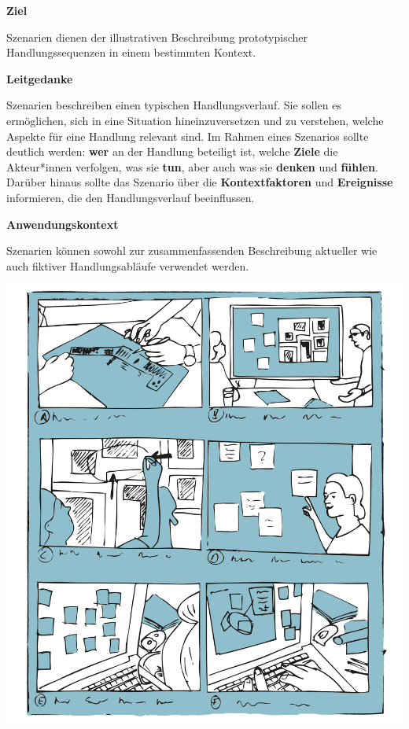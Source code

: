 \documentclass[
  a4paper,
]{book}
\begin{document}
\textbf{Ziel}

Szenarien dienen der illustrativen Beschreibung prototypischer Handlungssequenzen in einem bestimmten Kontext.

\textbf{Leitgedanke}

Szenarien beschreiben einen typischen Handlungsverlauf. Sie sollen es ermöglichen, sich in eine Situation hineinzuversetzen und zu verstehen, welche Aspekte für eine Handlung relevant sind.
Im Rahmen eines Szenarios sollte deutlich werden: \textbf{wer} an der Handlung beteiligt ist, welche \textbf{Ziele} die Akteur*innen verfolgen, was sie \textbf{tun}, aber auch was sie \textbf{denken} und \textbf{fühlen}. Darüber hinaus sollte das Szenario über die \textbf{Kontextfaktoren} und \textbf{Ereignisse} informieren, die den Handlungsverlauf beeinflussen.

\textbf{Anwendungskontext}

Szenarien können sowohl zur zusammenfassenden Beschreibung aktueller wie auch fiktiver Handlungsabläufe verwendet werden.

\begin{center}\includegraphics{Figures/07-05-Storyboard-blue-dark} \end{center}
\end{document}
